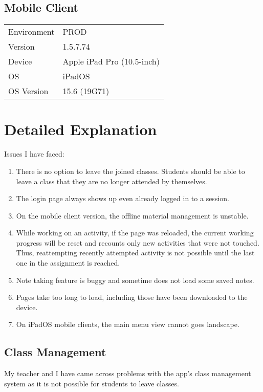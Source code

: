 \documentclass{article}
\begin{document}
\subsection{Mobile Client}
\begin{tabular}{p{7em} l}
Environment     & PROD\\
Version         & 1.5.7.74\\
Device          & Apple iPad Pro (10.5-inch)\\
OS              & iPadOS\\
OS Version      & 15.6 (19G71)
\end{tabular}

\pagebreak[4]

\section{Detailed Explanation}
\label{sec:detailed-explanation}
Issues I have faced:
\begin{enumerate}
\setlength\itemsep{0ex}
    \item There is no option to leave the joined classes. Students should be able to leave a class that they are no longer attended by themselves.
    \item The login page always shows up even already logged in to a session.
    \item On the mobile client version, the offline material management is unstable.
    \item While working on an activity, if the page was reloaded, the current working progress will be reset and recounts only new activities that were not touched.
            Thus, reattempting recently attempted activity is not possible until the last one in the assignment is reached.
    \item Note taking feature is buggy and sometime does not load some saved notes.
    \item Pages take too long to load, including those have been downloaded to the device.
    \item On iPadOS mobile clients, the main menu view cannot goes landscape.
\end{enumerate}

\subsection{Class Management}
My teacher and I have came across problems with the app's class management system as it is not
possible for students to leave classes.
\end{document}
